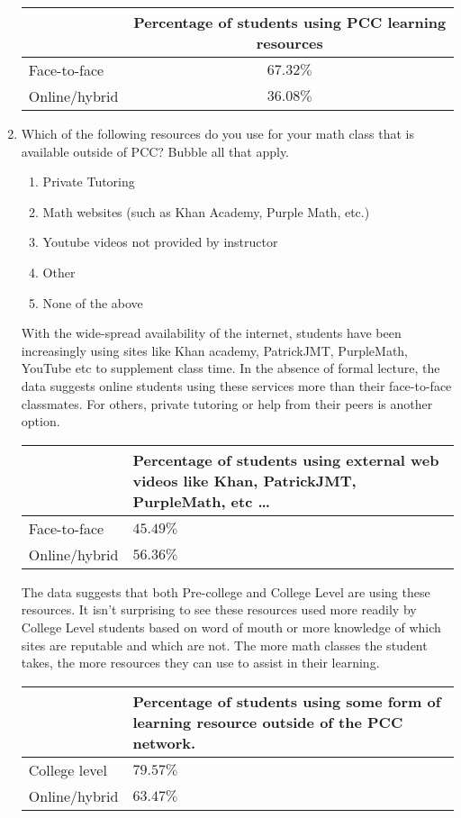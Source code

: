 \begin{enumerate}
	\begin{tabular}{lc}
		\toprule
		              & Percentage of students using PCC learning resources\\
		\midrule
		Face-to-face  & $67.32\%$                                                   \\
		Online/hybrid & $36.08\%$                                                   \\
		\bottomrule
	\end{tabular}
  \item Which of the following resources do you use for your math class that is available outside of PCC?  Bubble all that apply.
    \begin{enumerate}
      \item Private Tutoring
      \item  Math websites  (such as Khan Academy, Purple Math, etc.)
      \item  Youtube videos not provided by instructor
      \item  Other
      \item  None of the above
    \end{enumerate}
With the wide-spread availability of the internet, students have been increasingly using sites like Khan academy, PatrickJMT, PurpleMath, YouTube etc to supplement class time. In the absence of formal lecture, the data suggests online students using these services more than their face-to-face classmates. For others, private tutoring or help from their peers is another option. 

\begin{tabular}{lp{}}
		\toprule
		              & Percentage of students using external web videos like Khan, PatrickJMT, PurpleMath, etc \ldots\\
		\midrule
		Face-to-face  & $45.49\%$                                                   \\
		Online/hybrid & $56.36\%$                                                   \\
		\bottomrule
	\end{tabular}

    The data suggests that both Pre-college and College Level are using these resources. It isn't surprising to see these resources used more readily by College Level students based on word of mouth or more knowledge of which sites are reputable and which are not. The more math classes the student takes, the more resources they can use to assist in their learning. 

    \begin{tabular}{lp{}}
		\toprule
		              & Percentage of students using some form of learning resource outside of the PCC network. \\
		\midrule
		College level     & $79.57\%$                                 \\
		Online/hybrid & $63.47\%$                                 \\
		\bottomrule
	\end{tabular}

\end{enumerate}

